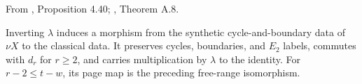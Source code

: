 \begin{definition}
\label{sem:Literature:lambda-inversion}
From \cite{Pst}, Proposition 4.40; \cite{BHS}, Theorem A.8.\par

Inverting $\lambda$ induces a morphism from the synthetic cycle-and-boundary data of $\nu X$ to the classical data. It preserves cycles, boundaries, and $E_2$ labels, commutes with $d_r$ for $r\ge2$, and carries multiplication by $\lambda$ to the identity. For $r-2\le t-w$, its page map is the preceding free-range isomorphism.
\end{definition}

